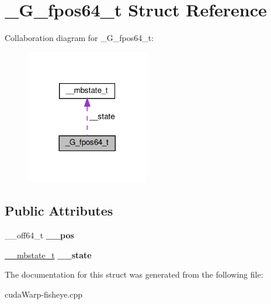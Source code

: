\hypertarget{struct__G__fpos64__t}{}\section{\+\_\+\+G\+\_\+fpos64\+\_\+t Struct Reference}
\label{struct__G__fpos64__t}


Collaboration diagram for \+\_\+\+G\+\_\+fpos64\+\_\+t\+:\nopagebreak
\begin{figure}[H]
\begin{center}
\leavevmode
\includegraphics[width=152pt]{struct__G__fpos64__t__coll__graph}
\end{center}
\end{figure}
\subsection*{Public Attributes}
\begin{DoxyCompactItemize}
\item 
\+\_\+\+\_\+off64\+\_\+t {\bfseries \+\_\+\+\_\+pos}\hypertarget{struct__G__fpos64__t_a5e289da2680acfd68c15e8f96524a091}{}\label{struct__G__fpos64__t_a5e289da2680acfd68c15e8f96524a091}

\item 
\hyperlink{struct____mbstate__t}{\+\_\+\+\_\+mbstate\+\_\+t} {\bfseries \+\_\+\+\_\+state}\hypertarget{struct__G__fpos64__t_ac06ed638762dc499046cf91403aa58bb}{}\label{struct__G__fpos64__t_ac06ed638762dc499046cf91403aa58bb}

\end{DoxyCompactItemize}


The documentation for this struct was generated from the following file\+:\begin{DoxyCompactItemize}
\item 
cuda\+Warp-\/fisheye.\+cpp\end{DoxyCompactItemize}
